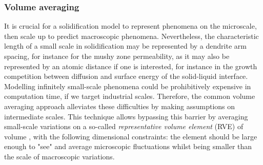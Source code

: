 \subsubsection{Volume averaging} \label{sec:volumeavg}

It is crucial for a solidification model to represent phenomena on the microscale, then scale up to predict 
macroscopic phenomena. Nevertheless, the characteristic length of a small scale in solidification may be represented by a dendrite arm spacing, for instance for the mushy zone permeability, as it may also be represented by an atomic distance if one is interested, 
for instance in the growth competition between diffusion and surface energy of the solid-liquid interface.
Modelling infinitely small-scale phenomena could be prohibitively expensive in computation time, if we target industrial scales.
Therefore, the common volume averaging approach alleviates these difficulties by making assumptions on intermediate scales. 
This technique allows bypassing this barrier by averaging small-scale variations on a so-called 
\emph{representative volume element} (RVE) \citep{dantzig_solidification_2009} of volume \rev, with the following 
dimensional constraints: the element should be large enough to "see" and average microscopic fluctuations 
whilst being smaller than the scale of macroscopic variations.

